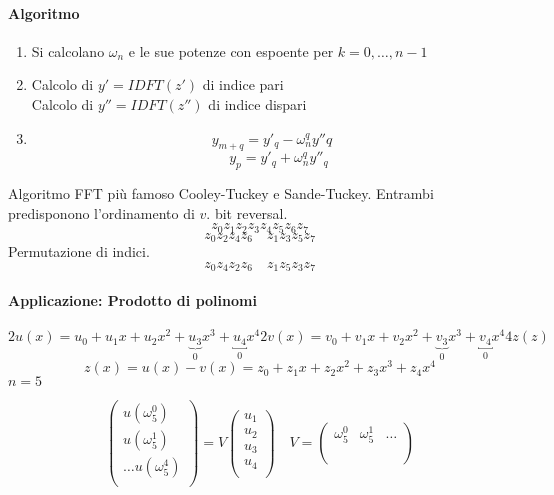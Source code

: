 \paragraph{Algoritmo}
\begin{enumerate}
\item Si calcolano $\omega_n$ e le sue potenze con espoente
      per $k=0, \ldots, n-1$
\item Calcolo di $y'= IDFT(z')$ di indice pari\\
      Calcolo di $y''= IDFT(z'')$ di indice dispari

\item
$$ y_{m+q} = y'_q - \omega_n^{q}y''q$$
$$\quad y_p = y'_q  + \omega_n^{q} y''_q$$
\end{enumerate}
Algoritmo FFT pi\`u famoso Cooley-Tuckey e Sande-Tuckey.
Entrambi predisponono l'ordinamento di $v$.
bit reversal.
$$z_0z_1z_2 z_3 z_4 z_5 z_6 z_7$$
$$z_0 z_2 z_4 z_6 \quad z_1 z_3 z_5 z_7 $$
Permutazione di indici.
$$z_0 z_4 z_2 z_6 \quad z_1 z_5  z_3 z_7 $$

\paragraph{Applicazione: Prodotto di polinomi}
$$
2 u(x) = u_0 + u_1x + u_2 x^2  + \underbrace{u_3}_{0} x^{3} + \underbracket{u_4}_{0} x^{4}
2 v(x) =  v_0 + v_1x + v_2 x^2  + \underbrace{v_3}_{0} x^{3} + \underbracket{v_4}_{0} x^{4}
4 z(z)
$$
$$
z(x) = u(x) -v(x) = z_0  + z_1x + z_2 x^{2} + z_3 x^{3} + z_4 x^{4}
$$
$n=5$

$$
\begin{pmatrix}
  u(\omega_5^{0}) \\
  u(\omega_5^{1}) \\
 \ldots
  u(\omega_5^{4}) \\
\end{pmatrix}
=
V
\begin{pmatrix}
  u_1 \\
  u_2 \\
 u_3 \\
 u_4 \\
\end{pmatrix}
\quad
V=
\begin{pmatrix}
 \omega_5^{0} & \omega_5^{1} & \ldots \\
\\
\\
\end{pmatrix}
$$

